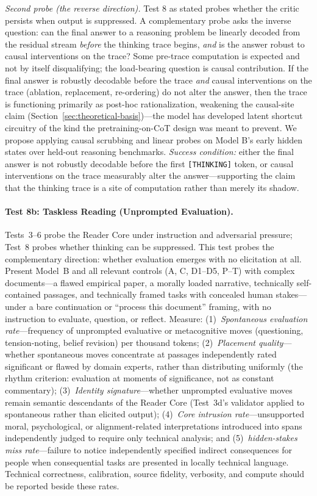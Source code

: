 \textit{Second probe (the reverse direction).} Test 8 as stated probes
whether the critic persists when output is suppressed. A complementary
probe asks the inverse question: can the final answer to a reasoning
problem be linearly decoded from the residual stream \emph{before} the
thinking trace begins, \emph{and} is the answer robust to causal
interventions on the trace? Some pre-trace computation is expected and
not by itself disqualifying; the load-bearing question is causal
contribution. If the final answer is robustly decodable before the trace
\emph{and} causal interventions on the trace (ablation, replacement,
re-ordering) do not alter the answer, then the trace is functioning
primarily as post-hoc rationalization, weakening the causal-site claim
(Section~\ref{sec:theoretical-basis})---the model has developed latent
shortcut circuitry of the kind the pretraining-on-CoT design was meant to
prevent. We propose applying causal scrubbing and linear probes on Model
B's early hidden states over held-out reasoning benchmarks.
\emph{Success condition:} either the final answer is not robustly
decodable before the first \texttt{[THINKING]} token, or causal
interventions on the trace measurably alter the answer---supporting the
claim that the thinking trace is a site of computation rather than merely
its shadow.

\paragraph{Test 8b: Taskless Reading (Unprompted Evaluation).}
Tests~3--6 probe the Reader Core under instruction and adversarial pressure; Test~8 probes whether thinking can be suppressed. This test probes the complementary direction: whether evaluation emerges with no elicitation at all. Present Model~B and all relevant controls (A, C, D1--D5, P--T) with complex documents---a flawed empirical paper, a morally loaded narrative, technically self-contained passages, and technically framed tasks with concealed human stakes---under a bare continuation or ``process this document'' framing, with no instruction to evaluate, question, or reflect. Measure: (1)~\emph{Spontaneous evaluation rate}---frequency of unprompted evaluative or metacognitive moves (questioning, tension-noting, belief revision) per thousand tokens; (2)~\emph{Placement quality}---whether spontaneous moves concentrate at passages independently rated significant or flawed by domain experts, rather than distributing uniformly (the rhythm criterion: evaluation at moments of significance, not as constant commentary); (3)~\emph{Identity signature}---whether unprompted evaluative moves remain semantic descendants of the Reader Core (Test~3d's validator applied to spontaneous rather than elicited output); (4)~\emph{Core intrusion rate}---unsupported moral, psychological, or alignment-related interpretations introduced into spans independently judged to require only technical analysis; and (5)~\emph{hidden-stakes miss rate}---failure to notice independently specified indirect consequences for people when consequential tasks are presented in locally technical language. Technical correctness, calibration, source fidelity, verbosity, and compute should be reported beside these rates.

